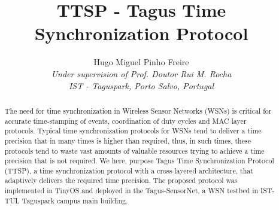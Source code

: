 \documentclass[11pt,a4]{article}
\begin{document}
\title{TTSP - Tagus Time Synchronization Protocol }
\author{Hugo Miguel Pinho Freire\\
\textit{Under supervision of Prof. Doutor Rui M. Rocha}\\ %
\textit{IST - Taguspark, Porto Salvo, Portugal}}
\maketitle
\begin{abstract}
The need for time synchronization in Wireless Sensor Networks (WSNs) is critical for accurate time-stamping of events, coordination of duty cycles and MAC layer protocols. Typical time synchronization protocols for WSNs tend to deliver a time precision that in many times is higher than required, thus, in such times, these protocols tend to waste vast amounts of valuable resources trying to achieve a time precision that is not required. We here, purpose Tagus Time Synchronization Protocol (TTSP), a time synchronization protocol with a cross-layered architecture, that adaptively delivers the required time precision. The proposed protocol was implemented in TinyOS and deployed in the Tagus-SensorNet, a WSN testbed in IST-TUL Taguspark campus main building.
\end{abstract}
\end{document}
